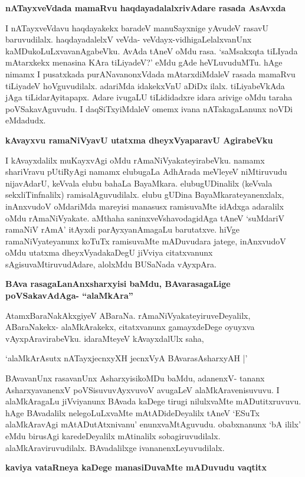 {\bf nATayxveVdada mamaRvu haqdayadalalxrivAdare rasada AsAvxda}

I nATayxveVdavu haqdayakekx baradeV manuSayxnige yAvudeV rasavU baruvudilalx. haqdayadalelxV veVda- veVdayx-vidhigaLelalxvanUnx kaMDukoLuLxvavanAgabeVku. AvAda tAneV oMdu rasa. `saMsakxqta tiLIyada mAtarxkekx menasina KAra tiLiyadeV?' eMdu gAde heVLuvuduMTu. hAge nimamx I pusatxkada purANavanonxVdada mAtarxdiMdaleV rasada mamaRvu tiLiyadeV hoVguvudilalx. adariMda idakekxVnU aDiDx ilalx. tiLiyabeVkAda jAga tiLidarAyitapapx. Adare ivugaLU tiLididadxre idara arivige oMdu taraha poVSakavAguvudu. I daqSiTxyiMdaleV omemx ivana nATakagaLanunx noVDi eMdadudx.

{\bf kAvayxvu ramaNiVyavU utatxma dheyxVyaparavU AgirabeVku}

I kAvayxdalilx muKayxvAgi oMdu rAmaNiVyakateyirabeVku. namamx shariVravu pUtiRyAgi namamx elubugaLa AdhArada meVleyeV niMtiruvudu nijavAdarU, keVvala elubu bahaLa BayaMkara. elubugUDinalilx (keVvala sekxliTinfnalilx) ramisalAguvudilalx. elubu gUDina BayaMkarateyanenxlalx, inAnxvudoV oMdariMda mareyisi manasusx ramisuvaMte idAdxga adaralilx oMdu rAmaNiVyakate. aMthaha saninxveVshavodagidAga tAneV `suMdariV ramaNiV rAmA' itAyxdi parAyxyanAmagaLu barutatxve. hiVge ramaNiVyateyanunx koTuTx ramisuvaMte mADuvudara jatege, inAnxvudoV oMdu utatxma dheyxVyadakaDegU jiVviya citatxvanunx sAgisuvaMtiruvudAdare, alolxMdu BUSaNada vAyxpAra.

{\bf BAva rasagaLanAnxsharxyisi baMdu, BAvarasagaLige poVSakavAdAga- ``alaMkAra''}

AtamxBaraNakAkxgiyeV ABaraNa. rAmaNiVyakateyiruveDeyalilx, ABaraNakekx- alaMkArakekx, citatxvanunx gamayxdeDege oyuyxva vAyxpAravirabeVku. idaraMteyeV kAvayxdalUlx saha, 

\begin{shloka}
`alaMkArAsutx nATayxjecnxyXH jecnxVyA BAvarasAsharxyAH |'
\end{shloka}

BAvavanUnx rasavanUnx AsharxyisikoMDu baMdu, adanenxV- tananx AsharxyavanenxV poVSisuvuvAyxvuvoV avugaLeV alaMkAravenisuvuvu. I alaMkAragaLu jiVviyanunx BAvada kaDege tirugi nilulxvaMte mADutitxruvuvu. hAge BAvadalilx nelegoLuLxvaMte mAtADideDeyalilx tAneV `ESuTx alaMkAravAgi mAtADutAtxnivanu' enunxvaMtAguvudu. obabxnanunx `bA ililx' eMdu birusAgi karedeDeyalilx mAtinalilx sobagiruvudilalx. alaMkAraviruvudilalx. BAvadalilxge ivananenxLeyuvudilalx.

{\bf kaviya vataRneya kaDege manasiDuvaMte mADuvudu vaqtitx}

